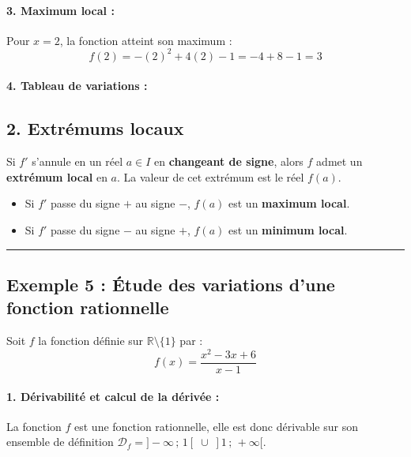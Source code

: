 \documentclass[12pt,a4paper]{article}
\begin{document}
\paragraph{3. Maximum local :}
Pour $x = 2$, la fonction atteint son maximum :
\[
f(2) = -(2)^2 + 4(2) - 1 = -4 + 8 - 1 = 3
\]

\paragraph{4. Tableau de variations :}

\begin{center}
\end{center}

\subsection*{\color{myred}2. Extrémums locaux}
Si $f'$ s'annule en un réel $a \in I$ en \textbf{changeant de signe}, alors $f$ admet un \textbf{extrémum local} en $a$. La valeur de cet extrémum est le réel $f(a)$.

\begin{itemize}
    \item Si $f'$ passe du signe $+$ au signe $-$, $f(a)$ est un \textbf{maximum local}.
    \item Si $f'$ passe du signe $-$ au signe $+$, $f(a)$ est un \textbf{minimum local}.
\end{itemize}

\vspace{0.3cm}
\hrule
\vspace{0.3cm}

\subsection*{\color{myred}Exemple 5 : Étude des variations d'une fonction rationnelle}

Soit $f$ la fonction définie sur $\mathbb{R} \setminus \{1\}$ par :
\[
f(x) = \frac{x^2 - 3x + 6}{x - 1}
\]

\paragraph{1. Dérivabilité et calcul de la dérivée :}
La fonction $f$ est une fonction rationnelle, elle est donc dérivable sur son ensemble de définition $\mathcal{D}_f = ]-\infty \,;\, 1[ \;\cup\; ]1 \,;\, +\infty[$.
\end{document}
